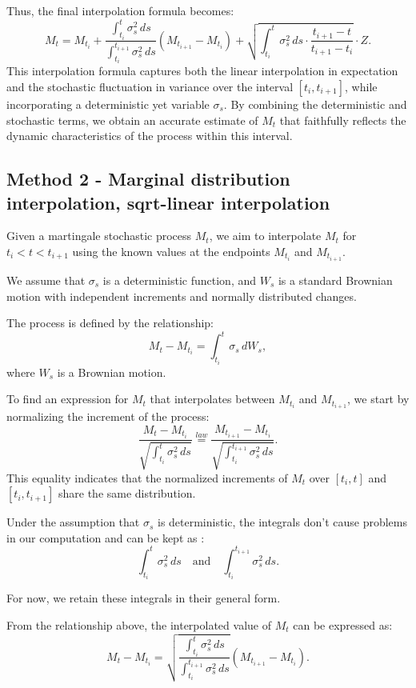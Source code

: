\documentclass{article}
\begin{document}
Thus, the final interpolation formula becomes:
\[
M_t = M_{t_i} + \frac{\int_{t_i}^t \sigma_s^2 \, ds}{\int_{t_i}^{t_{i+1}} \sigma_s^2 \, ds} (M_{t_{i+1}} - M_{t_i}) + \sqrt{\int_{t_i}^t \sigma_s^2 \, ds \cdot \frac{t_{i+1} - t}{t_{i+1} - t_i}} \cdot Z.
\]
This interpolation formula captures both the linear interpolation in expectation and the stochastic fluctuation in variance over the interval $[t_i, t_{i+1}]$, while incorporating a deterministic yet variable $\sigma_s$. By combining the deterministic and stochastic terms, we obtain an accurate estimate of $M_t$ that faithfully reflects the dynamic characteristics of the process within this interval.


\subsection{Method 2 - Marginal distribution interpolation, sqrt-linear interpolation}

Given a martingale stochastic process \( M_t \), we aim to interpolate \( M_t \) for \( t_i < t < t_{i+1} \) using the known values at the endpoints \( M_{t_i} \) and \( M_{t_{i+1}} \).

We assume that \(\sigma_s\) is a deterministic function, and \(W_s\) is a standard Brownian motion with independent increments and normally distributed changes.

The process is defined by the relationship:
\[
M_t - M_{t_i} = \int_{t_i}^{t} \sigma_s \, dW_s,
\]
where \( W_s \) is a Brownian motion.

To find an expression for \( M_t \) that interpolates between \( M_{t_i} \) and \( M_{t_{i+1}} \), we start by normalizing the increment of the process:
\[
\frac{M_t - M_{t_i}}{\sqrt{\int_{t_i}^{t} \sigma_s^2 \, ds}} \overset{law}{=} \frac{M_{t_{i+1}} - M_{t_i}}{\sqrt{\int_{t_i}^{t_{i+1}} \sigma_s^2 \, ds}}.
\]
This equality indicates that the normalized increments of \( M_t \) over \([t_i, t]\) and \([t_i, t_{i+1}]\) share the same distribution.

Under the assumption that \( \sigma_s \) is deterministic, the integrals don't cause problems in our computation and can be kept as :
\[
\int_{t_i}^{t} \sigma_s^2 \, ds \quad \text{and} \quad \int_{t_i}^{t_{i+1}} \sigma_s^2 \, ds.
\]

For now, we retain these integrals in their general form.

From the relationship above, the interpolated value of \( M_t \) can be expressed as:
\[
M_t - M_{t_i} = \sqrt{\frac{\int_{t_i}^{t} \sigma_s^2 \, ds}{\int_{t_i}^{t_{i+1}} \sigma_s^2 \, ds}} (M_{t_{i+1}} - M_{t_i}).
\]
\end{document}
